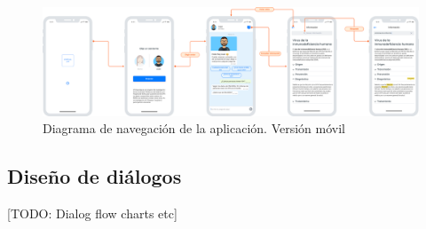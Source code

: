 \begin{figure}[htbp]
\centering
\includegraphics[scale=0.1]{../images/mobile_flow.png} 
\caption{Diagrama de navegación de la aplicación. Versión móvil}
\label{fig:mobile flow}
\end{figure}

\subsection{Diseño de diálogos}
[TODO: Dialog flow charts etc]